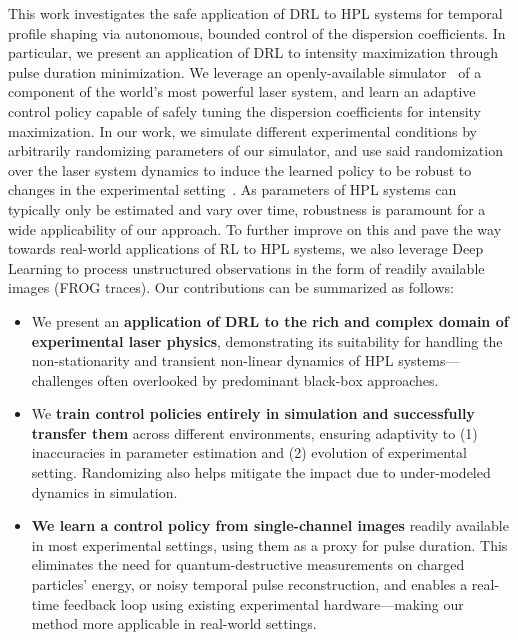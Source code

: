 This work investigates the safe application of DRL to HPL systems for temporal profile shaping via autonomous, bounded control of the dispersion coefficients. In particular, we present an application of DRL to intensity maximization through pulse duration minimization. We leverage an openly-available simulator~\citep{capuano2023temporl} of a component of the world’s most powerful laser system, and learn an adaptive control policy capable of safely tuning the dispersion coefficients for intensity maximization. In our work, we simulate different experimental conditions by arbitrarily randomizing parameters of our simulator, and use said randomization over the laser system dynamics to induce the learned policy to be robust to changes in the experimental setting~\citep{tiboni2023domain}.
As parameters of HPL systems can typically only be estimated and vary over time, robustness is paramount for a wide applicability of our approach. To further improve on this and pave the way towards real-world applications of RL to HPL systems, we also leverage Deep Learning to process unstructured observations in the form of readily available images (FROG traces). Our contributions can be summarized as follows:
\begin{itemize}
\item We present an \textbf{application of DRL to the rich and complex domain of experimental laser physics}, demonstrating its suitability for handling the non-stationarity and transient non-linear dynamics of HPL systems---challenges often overlooked by predominant black-box approaches.
\item We \textbf{train control policies entirely in simulation and successfully transfer them} across different environments, ensuring adaptivity to (1) inaccuracies in parameter estimation and (2) evolution of experimental setting. Randomizing also helps mitigate the impact  due to under-modeled dynamics in simulation.
\item \textbf{We learn a control policy from single-channel images} readily available in most experimental settings, using them as a proxy for pulse duration. This eliminates the need for quantum-destructive measurements on charged particles' energy, or noisy temporal pulse reconstruction, and enables a real-time feedback loop using existing experimental hardware---making our method more applicable in real-world settings.
\end{itemize}
